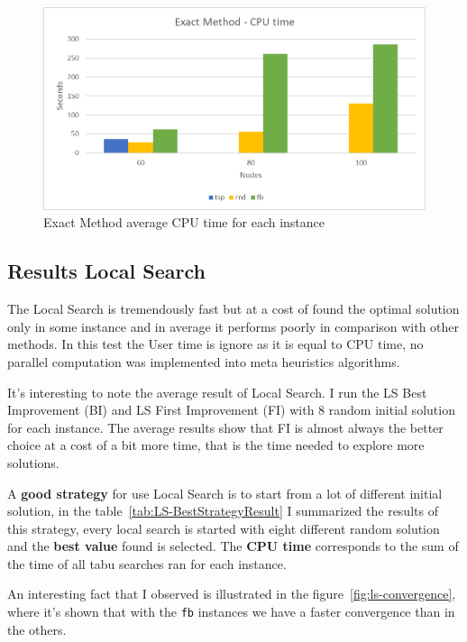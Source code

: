 	
	\begin{figure} [hb]
		\centering
		\includegraphics[width=\linewidth]{img/EM-results-time}
		\caption{Exact Method average CPU time for each instance}
		\label{fig:em-results-time}
	\end{figure}
	
	
	
\newpage
\subsection{Results Local Search}
\label{subsec:results-ls}
	The Local Search is tremendously fast but at a cost of found the optimal solution only in some instance and in average it performs poorly in comparison with other methods. In this test the User time is ignore as it is equal to CPU time, no parallel computation was implemented into meta heuristics algorithms.

	It's interesting to note the average result of Local Search. I run the LS Best Improvement (BI) and LS First Improvement (FI) with 8 random initial solution for each instance. The average results show that FI is almost always the better choice at a cost of a bit more time, that is the time needed to explore more solutions.
	
	A \textbf{good strategy} for use Local Search is to start from a lot of different initial solution, in the table~\ref{tab:LS-BestStrategyResult} I summarized the results of this strategy, every local search is started with eight different random solution and the \textbf{best value} found is selected. The \textbf{CPU time} corresponds to the sum of the time of all tabu searches ran for each instance.
	
	An interesting fact that I observed is illustrated in the figure~\ref{fig:ls-convergence}, where it's shown that with the \verb|fb| instances we have a faster convergence than in the others.
	
